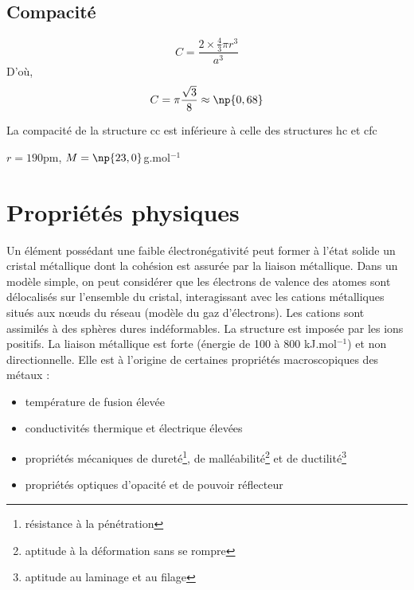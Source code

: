 \subsection{Compacité}
\begin{equation*}
    C = \frac{2\times \frac{4}{3} \pi r^3}{a^3}
\end{equation*}
D'où,
\begin{equation}
    C = \pi \frac{\sqrt{3}}{8} \approx \np{0,68}
\end{equation}
\begin{rem}
    La compacité de la structure cc est inférieure à celle
    des structures hc et cfc
\end{rem}
\begin{ex}[Na]
    $r = 190$pm, $M = \np{23,0}$g.mol$^{-1}$
\end{ex}

\section{Propriétés physiques}
Un élément possédant une faible électronégativité peut former
à l’état solide un cristal métallique dont la cohésion est
assurée par la liaison métallique.
Dans un modèle simple, on peut considérer que les électrons
de valence des atomes sont délocalisés sur l’ensemble du
cristal, interagissant avec les cations métalliques situés
aux n\oe uds du réseau (modèle du gaz d’électrons).
Les cations sont assimilés à des sphères dures
indéformables. La structure est imposée par les ions positifs.
La liaison métallique est forte (énergie de 100 à 800 kJ.mol$^{-1}$)
et non directionnelle. Elle est à l’origine de certaines
propriétés macroscopiques des métaux :
\begin{itemize}
    \item température de fusion élevée
    \item conductivités thermique et électrique élevées
    \item propriétés mécaniques de dureté\footnote{résistance à
        la pénétration}, de malléabilité\footnote{aptitude à la
        déformation sans se rompre} et de
        ductilité\footnote{aptitude au laminage et au filage}
    \item propriétés optiques d'opacité et de pouvoir réflecteur
\end{itemize}

